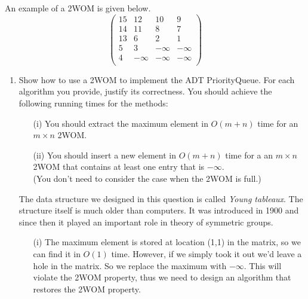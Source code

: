 \begin{codeExample}
  An example of a 2WOM is given below.
$$\left( \begin{array}{cccc}
    15 & 12 & 10 & 9 \\
    14 & 11 & 8 & 7 \\
    13 & 6 & 2 & 1 \\
    5 & 3 & -\infty & -\infty \\
    4 & -\infty & -\infty & -\infty \\
  \end{array}
\right) $$
\end{codeExample}
\begin{enumerate}
\item
Show how to use a 2WOM to implement the ADT PriorityQueue. For each
algorithm you provide, justify its correctness. You should achieve the
following running times for the methods:
\begin{itemize}
\item[(i)] You should extract the maximum element in $O(m+n)$ time for
    an $m\times n$ 2WOM.
\item[(ii)] You should insert a new element in $O(m+n)$ time for a
    an $m\times n$ 2WOM that contains at least
    one entry that is $-\infty$. \\
    (You don't need to consider the case when the 2WOM is full.)
\end{itemize}



\begin{solution}
The data structure we designed in this question is called
\emph{Young tableaux}. The structure itself is much older
than computers. It was introduced in 1900 and since
then it played an important role in theory of symmetric
groups.

\begin{itemize}
\item[(i)]
    The maximum element is stored at location (1,1) in the matrix,
    so we can find it in $O(1)$ time.  However, if we simply took it out
    we'd leave a hole in the matrix.
    So we replace the maximum
    with $-\infty$. This will violate the 2WOM property, thus we need
    to design an algorithm that restores the 2WOM property.


\end{itemize}
\end{solution}
\end{enumerate}
